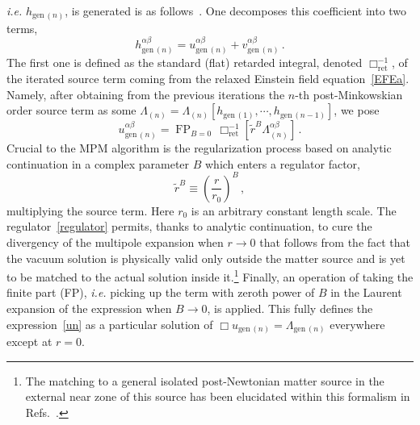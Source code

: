 \documentclass[prd,preprint,superscriptaddress,tightenlines,nofootinbib,
  eqsecnum,showpacs]{revtex4}
\begin{document}
\textit{i.e.} $h_{\mathrm{gen}\,(n)}$, is generated is as follows~\cite{BD86}.
One decomposes this coefficient into two terms,
%
\begin{equation} \label{hgenn}
h^{\alpha\beta}_{\mathrm{gen}\,(n)} =
u^{\alpha\beta}_{\mathrm{gen}\,(n)} +
v^{\alpha\beta}_{\mathrm{gen}\,(n)} \,.
\end{equation}
%
The first one is defined as the standard (flat) retarded integral,
denoted $\Box^{-1}_\mathrm{ret}$, of the iterated source term coming
from the relaxed Einstein field equation~\eqref{EFEa}. Namely, after
obtaining from the previous iterations the $n$-th post-Minkowskian
order source term as some
$\Lambda_{(n)}=\Lambda_{(n)}[h_{\mathrm{gen}\,(1)}, \cdots,
  h_{\mathrm{gen}\,(n-1)}]$, we pose
%
\begin{equation} \label{un}
u^{\alpha\beta}_{\mathrm{gen}\,(n)} = \mathop{\mathrm{FP}}_{B=0} \,
\Box^{-1}_\mathrm{ret} \left[ \widetilde{r}^B
  \Lambda_{(n)}^{\alpha\beta} \right] \,.
\end{equation}
%
Crucial to the MPM algorithm is the regularization process based on
analytic continuation in a complex parameter $B$ which enters a
regulator factor,
%
\begin{equation} \label{regulator}
\widetilde{r}^B \equiv \left(\frac{r}{r_0}\right)^B \, ,
\end{equation}
%
multiplying the source term. Here $r_0$ is an arbitrary constant
length scale. The regulator~\eqref{regulator} permits, thanks to
analytic continuation, to cure the divergency of the multipole
expansion when $r\to 0$ that follows from the fact that the vacuum
solution is physically valid only outside the matter source and is yet
to be matched to the actual solution inside it.\footnote{The matching
  to a general isolated post-Newtonian matter source in the external
  near zone of this source has been elucidated within this
    formalism in Refs.~\cite{B95, B98mult, PB02, BFN05}.} Finally, an
operation of taking the finite part (FP), \textit{i.e.} picking up the
term with zeroth power of $B$ in the Laurent expansion of the
expression when $B\to 0$, is applied. This fully defines the
expression~\eqref{un} as a particular solution of $\Box
u_{\mathrm{gen}\,(n)} = \Lambda_{\mathrm{gen}\,(n)}$ everywhere except
at $r=0$.
\end{document}
